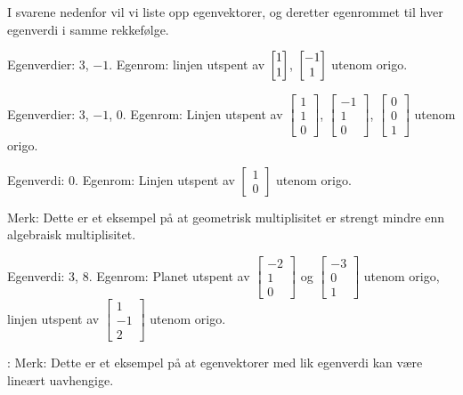 \begin{losning}
I svarene nedenfor vil vi liste opp egenvektorer, og deretter egenrommet til hver egenverdi i samme rekkefølge.

\begin{punkt}
Egenverdier: 3, $-1$. Egenrom: linjen utspent av $\begin{bmatrix} 1 \\ 1 \end{bmatrix}$, $\begin{bmatrix} -1 \\ 1 \end{bmatrix}$ utenom origo.
\end{punkt}

\begin{punkt}
Egenverdier: 3, $-1$, 0. Egenrom: Linjen utspent av $\begin{bmatrix} 
1\\
1\\
0
\end{bmatrix}$, $\begin{bmatrix} 
-1\\
1\\
0
\end{bmatrix}$, $\begin{bmatrix} 
0\\
0\\
1
\end{bmatrix}$ utenom origo.

\end{punkt}

\begin{punkt}
Egenverdi: 0. Egenrom: Linjen utspent av $\begin{bmatrix} 
1\\
0
\end{bmatrix}$ utenom origo.

\noindent
Merk: Dette er et eksempel på at geometrisk multiplisitet er strengt mindre enn algebraisk multiplisitet.
\end{punkt}

\begin{punkt}
Egenverdi: 3, 8. Egenrom: Planet utspent av $\begin{bmatrix} 
-2\\
1\\
0
\end{bmatrix}$ og $\begin{bmatrix} 
-3\\
0\\
1
\end{bmatrix}$ utenom origo, linjen utspent av $\begin{bmatrix} 
1\\
-1\\
2
\end{bmatrix}$ utenom origo.

\noindent:
Merk: Dette er et eksempel på at egenvektorer med lik egenverdi kan være lineært uavhengige.
\end{punkt}



\end{losning}




